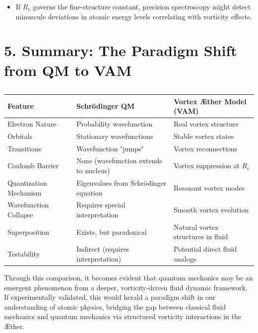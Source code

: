 \begin{itemize}
    \item If \(R_c\) governs the fine-structure constant, precision spectroscopy might detect minuscule deviations in atomic energy levels correlating with vorticity effects.
\end{itemize}

\section*{5. Summary: The Paradigm Shift from QM to VAM}

\begin{table}[h]
    \centering
    \begin{tabular}{lll}
        \toprule
        \textbf{Feature} & \textbf{Schrödinger QM} & \textbf{Vortex Æther Model (VAM)} \\
        \midrule
        Electron Nature & Probability wavefunction & Real vortex structure \\
        Orbitals & Stationary wavefunctions & Stable vortex states \\
        Transitions & Wavefunction "jumps" & Vortex reconnections \\
        Coulomb Barrier & None (wavefunction extends to nucleus) & Vortex suppression at \(R_c\) \\
        Quantization Mechanism & Eigenvalues from Schrödinger equation & Resonant vortex modes \\
        Wavefunction Collapse & Requires special interpretation & Smooth vortex evolution \\
        Superposition & Exists, but paradoxical & Natural vortex structures in fluid \\
        Testability & Indirect (requires interpretation) & Potential direct fluid analogs \\
        \bottomrule
    \end{tabular}
    \caption{}
    \label{tab:QM-VAM-comparison}
\end{table}

Through this comparison, it becomes evident that quantum mechanics may be an emergent phenomenon from a deeper, vorticity-driven fluid dynamic framework. If experimentally validated, this would herald a paradigm shift in our understanding of atomic physics, bridging the gap between classical fluid mechanics and quantum mechanics via structured vorticity interactions in the Æther.

